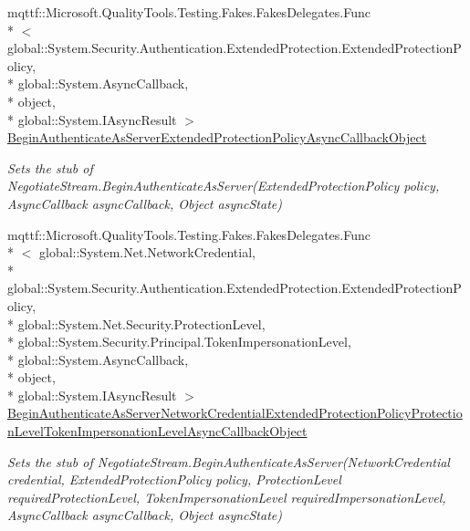 \begin{DoxyCompactItemize}
mqttf\-::\-Microsoft.\-Quality\-Tools.\-Testing.\-Fakes.\-Fakes\-Delegates.\-Func\\*
$<$ global\-::\-System.\-Security.\-Authentication.\-Extended\-Protection.\-Extended\-Protection\-Policy, \\*
global\-::\-System.\-Async\-Callback, \\*
object, \\*
global\-::\-System.\-I\-Async\-Result $>$ \hyperlink{class_system_1_1_net_1_1_security_1_1_fakes_1_1_stub_negotiate_stream_a8d4beff7026a487ca05e8f4385e91975}{Begin\-Authenticate\-As\-Server\-Extended\-Protection\-Policy\-Async\-Callback\-Object}
\begin{DoxyCompactList}\small\item\em Sets the stub of Negotiate\-Stream.\-Begin\-Authenticate\-As\-Server(\-Extended\-Protection\-Policy policy, Async\-Callback async\-Callback, Object async\-State)\end{DoxyCompactList}\item 
mqttf\-::\-Microsoft.\-Quality\-Tools.\-Testing.\-Fakes.\-Fakes\-Delegates.\-Func\\*
$<$ global\-::\-System.\-Net.\-Network\-Credential, \\*
global\-::\-System.\-Security.\-Authentication.\-Extended\-Protection.\-Extended\-Protection\-Policy, \\*
global\-::\-System.\-Net.\-Security.\-Protection\-Level, \\*
global\-::\-System.\-Security.\-Principal.\-Token\-Impersonation\-Level, \\*
global\-::\-System.\-Async\-Callback, \\*
object, \\*
global\-::\-System.\-I\-Async\-Result $>$ \hyperlink{class_system_1_1_net_1_1_security_1_1_fakes_1_1_stub_negotiate_stream_a16cbbc7c52865270c42fb7f80c6537ae}{Begin\-Authenticate\-As\-Server\-Network\-Credential\-Extended\-Protection\-Policy\-Protection\-Level\-Token\-Impersonation\-Level\-Async\-Callback\-Object}
\begin{DoxyCompactList}\small\item\em Sets the stub of Negotiate\-Stream.\-Begin\-Authenticate\-As\-Server(\-Network\-Credential credential, Extended\-Protection\-Policy policy, Protection\-Level required\-Protection\-Level, Token\-Impersonation\-Level required\-Impersonation\-Level, Async\-Callback async\-Callback, Object async\-State)\end{DoxyCompactList}\item 

\end{DoxyCompactItemize}
